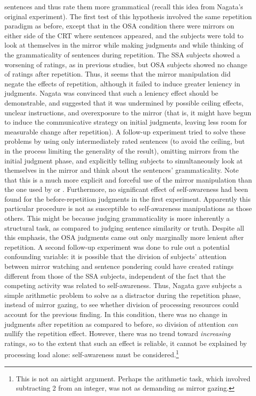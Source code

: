 sentences  and thus rate them more grammatical  (recall this idea from Nagata's original experiment). The first test of this hypothesis involved the same repetition paradigm as before, except that in the OSA condition there were mirrors on either side of the CRT where sentences appeared, and the subjects were told to look at themselves in the mirror while making judgments  and while thinking of the grammaticality  of sentences during repetition. The SSA subjects showed a worsening of ratings, as in previous studies, but OSA subjects showed no change of ratings after repetition. Thus, it seems that the mirror manipulation  did negate the effects of repetition,  although it failed to induce greater leniency  in judgments.  Nagata was convinced that such a leniency effect should be demonstrable, and suggested that it was undermined by possible ceiling effects, unclear instructions, and overexposure to the mirror (that is, it might have begun to induce the communicative strategy on initial judgments,  leaving less room for measurable change after repetition). A follow-up experiment tried to solve these problems by using only intermediately  rated  sentences  (to avoid the ceiling, but  in the process  limiting the generality of the result), omitting mirrors from the initial judgment phase, and explicitly  telling  subjects to simultaneously  look at themselves  in the mirror and think about the sentences' grammaticality. Note that this is a much more explicit and forceful use of the mirror manipulation than the one used by \citeauthor{DuvalEtAl1972}  or \citeauthor{CarrollEtAl1981}.  Furthermore,  no significant effect of  self-awareness had been found for the before-repetition judgments  in the first experiment. Apparently this particular procedure is not as susceptible to self-awareness manipulations  as those others. This might be because judging  grammaticality  is more inherently  a structural task, as compared to judging  sentence similarity or truth. Despite  all this emphasis,  the OSA judgments  came out only marginally more lenient after repetition. A second follow-up experiment was done to rule out a potential confounding variable: it is possible that the division of subjects' attention between mirror watching and sentence pondering could have created ratings different from those of the SSA subjects, independent of the fact that the competing activity was related  to self-awareness. Thus, Nagata gave subjects a simple arithmetic problem to solve as a distractor during the repetition phase, instead of mirror gazing, to see whether division of processing resources could account for the previous  finding. In this condition, there was no change in judgments  after repetition as compared to before, so division of attention \textit{can} nullify the repetition effect. However, there was no trend toward \textit{increasing} ratings, so to the extent that
such an effect is reliable, it cannot be explained by processing load alone: self-awareness must be considered.\footnote{This is not an airtight argument. Perhaps the arithmetic task, which involved subtracting 2 from an integer, was not as demanding as mirror gazing.}

